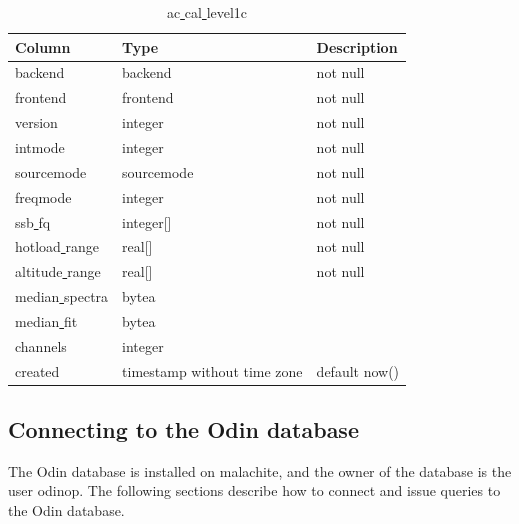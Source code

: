 \documentclass[12pt]{article}
\begin{document}
\begin{table}
\begin{tiny}
   \begin{subtable}{.9\linewidth}
      \captionsetup{font=scriptsize}
      \centering
\caption{ac\underline{ }cal\underline{ }level1c}
\label{table:ac1b2}
        \begin{tabular}{l l l}
\hline\hline
Column & Type & Description \\ [0.5ex]
\hline
backend     &    backend           &           not null \\
 frontend    &    frontend         &            not null\\
 version     &    integer          &            not null\\
 intmode     &    integer          &            not null\\
 sourcemode  &    sourcemode       &            not null\\
 freqmode    &    integer          &            not null\\
 ssb\underline{ }fq      &    integer[]        &            not null\\
 hotload\underline{ }range &  real[]           &            not null\\
 altitude\underline{ }range &  real[]          &             not null\\
 median\underline{ }spectra & bytea            &            \\
 median\underline{ }fit    &  bytea            &            \\
 channels     &   integer         &             \\
 created      &   timestamp without time zone & default now() \\[1ex]
\hline
\end{tabular}
\end{subtable}

\end{tiny}
\end{table}


\clearpage
\newpage
\subsection{Connecting to the Odin database}
The Odin database is installed on malachite,  and the owner of
the database is the user odinop. The following sections describe
how to connect and issue queries to the Odin database.
\label{sec:usermanual}
\end{document}
